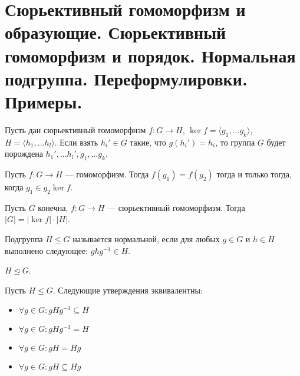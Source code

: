 % 
% 
\section{Сюрьективный гомоморфизм и образующие. Сюрьективный гомоморфизм и порядок. Нормальная подгруппа. Переформулировки. Примеры.}
\begin{st}
    Пусть дан сюрьективный  гомоморфизм $ f \colon G \to  H $, $ \ker f = \langle g_1, \ldots g_k \rangle$, $ H = \langle h_1, \ldots h_l \rangle$. Если взять $ h_i' \in G$ такие, что $ g(h_i') = h_i$, то группа  $ G$ будет порождена  $ h_1', \ldots h_l', g_1, \ldots g_k$.
\end{st}
\begin{lm}
    Пусть $ f \colon G \to  H$ --- гомоморфизм. Тогда $ f(g_1) = f(g_2)$ тогда и только тогда, когда $ g_1 \in g_2 \ker f$.
\end{lm}
\begin{st}
     Пусть $ G$ конечна,  $ f\colon  G \to  H$ --- сюрьективный гомоморфизм. Тогда $ \lvert G \rvert  = \lvert \ker f \rvert \cdot \lvert H \rvert $.
\end{st}
\begin{defn}
    Подгруппа $ H \le G$ называется нормальной, если для любых $ g \in G$ и $ h \in H$ выполнено следующее: $ ghg^{-1} \in H$.
    \begin{name}
        $ H \trianglelefteq G$.
    \end{name}
\end{defn}
\begin{st}[Переформулировки]
    Пусть  $ H \le G$. Следующие утверждения эквивалентны:
    \begin{itemize}[noitemsep]
	\item $ \forall  g \in G\colon gHg^{-1} \subseteq H$
	\item $ \forall g \in G\colon gHg^{-1} = H$
	\item $ \forall g \in G\colon gH = Hg$
	\item $ \forall g \in G\colon gH \subseteq Hg$
    \end{itemize}
\end{st}
% 
